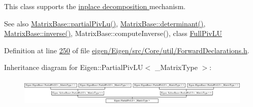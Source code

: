 This class supports the \hyperlink{group___inplace_decomposition}{inplace decomposition } mechanism.

\begin{DoxySeeAlso}{See also}
\hyperlink{group___core___module_a6199d8aaf26c1b8ac3097fdfa7733a1e}{Matrix\+Base\+::partial\+Piv\+Lu()}, \hyperlink{group___core___module_a7ad8f77004bb956b603bb43fd2e3c061}{Matrix\+Base\+::determinant()}, \hyperlink{group___core___module_a7712eb69e8ea3c8f7b8da1c44dbdeebf}{Matrix\+Base\+::inverse()}, Matrix\+Base\+::compute\+Inverse(), class \hyperlink{group___l_u___module_class_eigen_1_1_full_piv_l_u}{Full\+Piv\+LU} 
\end{DoxySeeAlso}


Definition at line \hyperlink{eigen_2_eigen_2src_2_core_2util_2_forward_declarations_8h_source_l00250}{250} of file \hyperlink{eigen_2_eigen_2src_2_core_2util_2_forward_declarations_8h_source}{eigen/\+Eigen/src/\+Core/util/\+Forward\+Declarations.\+h}.

Inheritance diagram for Eigen\+:\+:Partial\+Piv\+LU$<$ \+\_\+\+Matrix\+Type $>$\+:\begin{figure}[H]
\begin{center}
\leavevmode
\includegraphics[height=1.354839cm]{group___l_u___module}
\end{center}
\end{figure}
